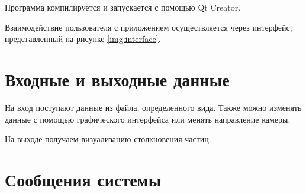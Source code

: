 Программа компилируется и запускается с помощью Qt Creator. 

Взаимодействие пользователя с приложением осуществляется через интерфейс, представленный на рисунке \ref{img:interface}. 

\section{\textbf{Входные и выходные данные }}

На вход поступают данные из файла, определенного вида. Также можно изменять данные с помощью графического интерфейса или менять направление камеры. 

На выходе получаем визуализацию столкновения частиц. 


\section{\textbf{Сообщения  системы }}

